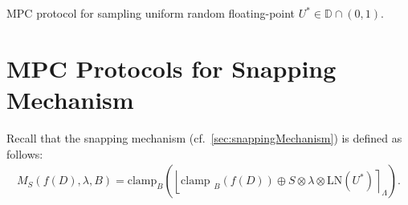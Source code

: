                   \begin{protocol}[tbh!]
                        \centering
                        \caption{MPC protocol for sampling uniform random floating-point $U^{*}\in \mathbb{D} \cap \left(0,1\right) $.}
                        \label{prot:RandFloat1}
                  \end{protocol}
                  \FloatBarrier


                  \section{MPC Protocols for Snapping Mechanism}
                  \label{sec:MPCProtocolsforSnappingMechanism}

                  Recall that the snapping mechanism (cf.~\autoref{sec:snappingMechanism}) is defined as follows:
                  \begin{equation}
                        \begin{split}
                              M_{S}\left(f\left(D\right),\lambda,B\right) =\text{clamp}_{B}\left(\left\lfloor\text {clamp }_{B}\left(f\left(D\right) \right) \oplus S\otimes \lambda\otimes \text{LN}\left(U^{*}\right) \right\rceil_{\Lambda}\right).
                        \end{split}
                  \end{equation}

